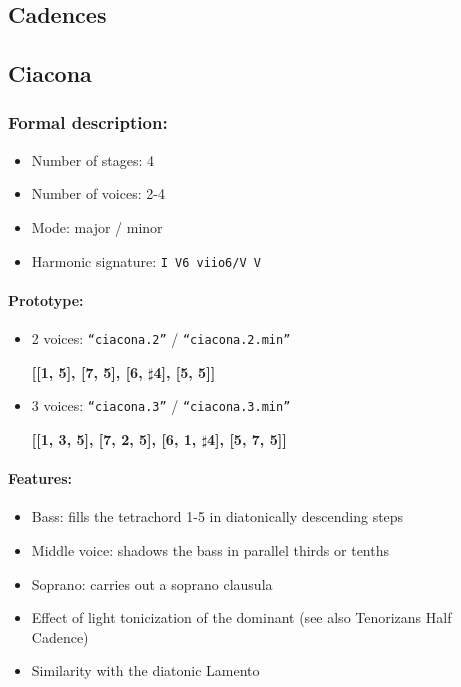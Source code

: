 ﻿\documentclass[11pt, openany]{article}
\begin{document}
	\subsection{Cadences}


	\subsection{Ciacona}

\subsubsection{Formal description:}
\begin{itemize}
\item Number of stages: 4
\item Number of voices: 2-4
\item Mode: major / minor
\item Harmonic signature: \texttt{I V6 viio6/V V}
\end{itemize}

\paragraph{Prototype:}
\begin{itemize}
\item 2 voices: \texttt{“ciacona.2”} / \texttt{“ciacona.2.min”}
	\begin{center}	
	\textbf{[[1, 5], [7, 5], [6, $\sharp$4], [5, 5]]}
	\end{center}
\item 3 voices: \texttt{“ciacona.3”} / \texttt{“ciacona.3.min”}
	\begin{center}	
	\textbf{[[1, 3, 5], [7, 2, 5], [6, 1, $\sharp$4], [5, 7, 5]]}
	\end{center}
\end{itemize}

\paragraph{Features:}
\begin{itemize}
\item Bass: fills the tetrachord 1-5 in diatonically descending steps
\item Middle voice: shadows the bass in parallel thirds or tenths
\item Soprano: carries out a soprano clausula
\item Effect of light tonicization of the dominant (see also Tenorizans Half Cadence)
\item Similarity with the diatonic Lamento
\end{itemize}
\end{document}
